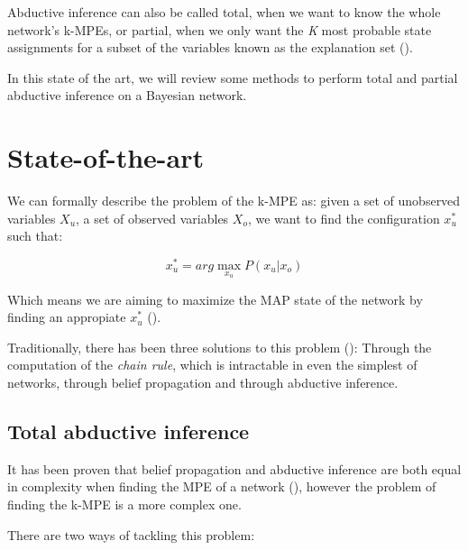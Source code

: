 \documentclass[a4paper,11pt]{article}
\begin{document}
Abductive inference can also be called total, when we want to know the whole network's k-MPEs, or partial, when we only want the \textit{K} most probable state assignments for a subset of the variables known as the explanation set 
(\cite{fortier2013}).

In this state of the art, we will review some methods to perform total and partial abductive inference on a Bayesian network.

\section{State-of-the-art}

We can formally describe the problem of the k-MPE as: given a set of unobserved variables $X_u$, a set of observed variables $X_o$, we want to find the configuration $x^*_u$ such that:

\begin{equation}
x^*_u = arg\max_{x_u} P(x_u | x_o)
\label{eqn:MPE}
\end{equation}

Which means we are aiming to maximize the MAP state of the network by finding an appropiate $x^*_u$ (\cite{deCampos2002}).

Traditionally, there has been three solutions to this problem (\cite{deCampos2001}): Through the computation of the \textit{chain rule}, which is intractable in even the simplest of networks, through belief propagation and through abductive inference.


\subsection{Total abductive inference}
It has been proven that belief propagation and abductive inference are both equal in complexity when finding the MPE of a network (\cite{dawid1992}), however the problem of finding the k-MPE is a more complex one.

There are two ways of tackling this problem:
\end{document}
